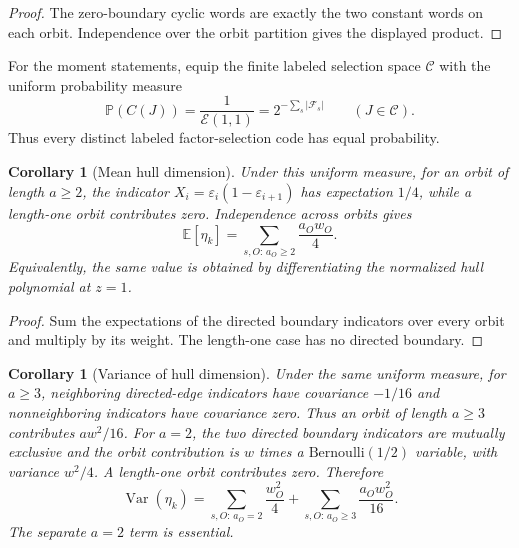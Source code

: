 \documentclass[10pt,a4paper]{article}
\newcommand{\Fs}{\mathcal F_s}
\newcommand{\Epoly}{\mathscr E}
\numberwithin{equation}{section}
\theoremstyle{plain}
\newtheorem{corollary}[theorem]{Corollary}
\theoremstyle{definition}
\theoremstyle{remark}
\begin{document}
\begin{proof}
The zero-boundary cyclic words are exactly the two constant words on each orbit.
Independence over the orbit partition gives the displayed product.
\end{proof}

For the moment statements, equip the finite labeled selection space
$\mathscr C$ with the uniform probability measure
\[
\mathbb P(C(J))=\frac{1}{\Epoly(1,1)}
 =2^{-\sum_s|\Fs|}
 \qquad(J\in\mathscr C).
\]
Thus every distinct labeled factor-selection code has equal probability.

\begin{corollary}[Mean hull dimension]\label{cor:mean}
Under this uniform measure, for an orbit of length $a\geq2$, the indicator
$X_i=\varepsilon_i(1-\varepsilon_{i+1})$ has expectation $1/4$, while a length-one
orbit contributes zero. Independence across orbits gives
\begin{equation}\label{eq:mean}
\mathbb E[\eta_k]
 =\sum_{s,O:\,a_O\geq2}\frac{a_Ow_O}{4}.
\end{equation}
Equivalently, the same value is obtained by differentiating the normalized hull
polynomial at $z=1$.
\end{corollary}

\begin{proof}
Sum the expectations of the directed boundary indicators over every orbit and
multiply by its weight. The length-one case has no directed boundary.
\end{proof}

\begin{corollary}[Variance of hull dimension]\label{cor:variance}
Under the same uniform measure, for $a\geq3$, neighboring directed-edge
indicators have covariance $-1/16$ and nonneighboring indicators have covariance
zero. Thus an orbit of length $a\geq3$ contributes $aw^2/16$. For $a=2$, the two
directed boundary indicators are mutually exclusive and the orbit contribution is
$w$ times a $\mathrm{Bernoulli}(1/2)$ variable, with variance $w^2/4$. A
length-one orbit contributes zero. Therefore
\begin{equation}\label{eq:var}
\operatorname{Var}(\eta_k)
 =\sum_{s,O:\,a_O=2}\frac{w_O^2}{4}
  +\sum_{s,O:\,a_O\geq3}\frac{a_Ow_O^2}{16}.
\end{equation}
The separate $a=2$ term is essential.
\end{corollary}
\end{document}
